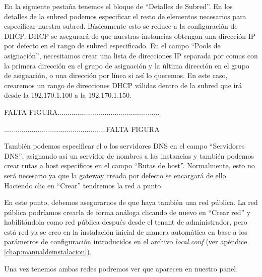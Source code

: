 En  la siguiente pestaña tenemos el bloque de  “Detalles de Subred”. En los detalles de la subred podemos especificar el resto de elementos necesarios para especificar nuestra subred. Básicamente esto se reduce a la configuración de DHCP. DHCP se asegurará de que nuestras instancias obtengan una dirección IP por defecto en el rango de subred especificado. En el campo “Pools de asignación”, necesitamos crear una lista de direcciones IP separada por comas con la primera dirección en el grupo de asignación y la última dirección en el grupo de asignación, o una dirección por línea si así lo queremos. En este caso, crearemos un rango de direcciones DHCP válidas dentro de la subred que irá desde la 192.170.1.100 a la 192.170.1.150. %

\begin{tcolorbox}[colback=green!5!white,colframe=green!75!black]
FALTA FIGURA....................................................

....................................................FALTA FIGURA
\end{tcolorbox}

También podemos especificar el o los servidores DNS en el campo “Servidores DNS”, asignando así un servidor de nombres a las instancias y también podemos crear rutas a host específicos en el campo “Rutas de host”. Normalmente, esto no será necesario ya que la gateway creada por defecto se encargará de ello. Haciendo clic en “Crear” tendremos la red a punto.

En este punto, debemos asegurarnos de que haya también una red pública. La red pública podríamos crearla de forma análoga clicando de nuevo en “Crear red” y habilitándola como red pública después desde el tenant de administrador, pero está red ya se creo en la instalación inicial de manera automática en base a los parámetros de configuración introducidos en el archivo \textit{local.conf} (ver apéndice \ref{chap:manualdeinstalacion}).

Una vez tenemos ambas redes podremos ver que aparecen en nuestro panel.

